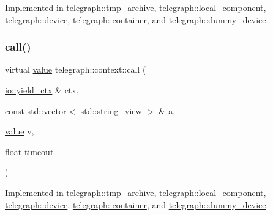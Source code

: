 Implemented in \hyperlink{classtelegraph_1_1tmp__archive_a9edb8a731ef989f40ae06e4b6c63c0be}{telegraph\+::tmp\+\_\+archive}, \hyperlink{classtelegraph_1_1local__component_af4d74d161754055d3f811bfe95a59f26}{telegraph\+::local\+\_\+component}, \hyperlink{classtelegraph_1_1device_ac6558ddeed4799f4d69428863363a1e6}{telegraph\+::device}, \hyperlink{classtelegraph_1_1container_a499649499d61f07dbe44bbec933414a0}{telegraph\+::container}, and \hyperlink{classtelegraph_1_1dummy__device_af2e3be5731809d7693cb6a4607e5e3f6}{telegraph\+::dummy\+\_\+device}.

\mbox{\label{classtelegraph_1_1context_a0798d49ea0874a870d4c980f6f09b6c2}} 
\subsubsection{\texorpdfstring{call()}{call()}\hspace{0.1cm}{\footnotesize\ttfamily [2/2]}}
{\footnotesize\ttfamily virtual \hyperlink{classtelegraph_1_1value}{value} telegraph\+::context\+::call (\begin{DoxyParamCaption}\item[{\hyperlink{structboost_1_1asio_1_1yield__ctx}{io\+::yield\+\_\+ctx} \&}]{ctx,  }\item[{const std\+::vector$<$ std\+::string\+\_\+view $>$ \&}]{a,  }\item[{\hyperlink{classtelegraph_1_1value}{value}}]{v,  }\item[{float}]{timeout }\end{DoxyParamCaption})\hspace{0.3cm}{\ttfamily [pure virtual]}}



Implemented in \hyperlink{classtelegraph_1_1tmp__archive_a1ccf8c90f14b36f3a09a501e0931e42e}{telegraph\+::tmp\+\_\+archive}, \hyperlink{classtelegraph_1_1local__component_a6fa6fbf49a0d77a8da54b4a77b578edd}{telegraph\+::local\+\_\+component}, \hyperlink{classtelegraph_1_1device_a581368ab8f35ef72db17d2e330ded068}{telegraph\+::device}, \hyperlink{classtelegraph_1_1container_a83d26f574b7f75655be9752147e30dce}{telegraph\+::container}, and \hyperlink{classtelegraph_1_1dummy__device_ab037df44b352953369760dd6071d84b5}{telegraph\+::dummy\+\_\+device}.

\mbox{\label{classtelegraph_1_1context_a4017c1bcd9c84170a5cb612ae45d6fb4}} 
